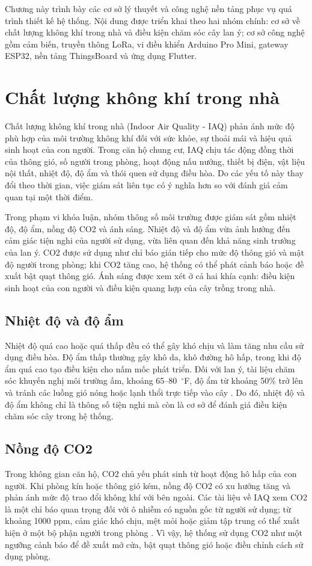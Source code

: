 Chương này trình bày các cơ sở lý thuyết và công nghệ nền tảng phục vụ quá trình thiết kế hệ thống. Nội dung được triển khai theo hai nhóm chính: cơ sở về chất lượng không khí trong nhà và điều kiện chăm sóc cây lan ý; cơ sở công nghệ gồm cảm biến, truyền thông LoRa, vi điều khiển Arduino Pro Mini, gateway ESP32, nền tảng ThingsBoard và ứng dụng Flutter.

\section{Chất lượng không khí trong nhà}
Chất lượng không khí trong nhà (Indoor Air Quality - IAQ) phản ánh mức độ phù hợp của môi trường không khí đối với sức khỏe, sự thoải mái và hiệu quả sinh hoạt của con người. Trong căn hộ chung cư, IAQ chịu tác động đồng thời của thông gió, số người trong phòng, hoạt động nấu nướng, thiết bị điện, vật liệu nội thất, nhiệt độ, độ ẩm và thói quen sử dụng điều hòa. Do các yếu tố này thay đổi theo thời gian, việc giám sát liên tục có ý nghĩa hơn so với đánh giá cảm quan tại một thời điểm.

Trong phạm vi khóa luận, nhóm thông số môi trường được giám sát gồm nhiệt độ, độ ẩm, nồng độ CO2 và ánh sáng. Nhiệt độ và độ ẩm vừa ảnh hưởng đến cảm giác tiện nghi của người sử dụng, vừa liên quan đến khả năng sinh trưởng của lan ý. CO2 được sử dụng như chỉ báo gián tiếp cho mức độ thông gió và mật độ người trong phòng; khi CO2 tăng cao, hệ thống có thể phát cảnh báo hoặc đề xuất bật quạt thông gió. Ánh sáng được xem xét ở cả hai khía cạnh: điều kiện sinh hoạt của con người và điều kiện quang hợp của cây trồng trong nhà.

\subsection{Nhiệt độ và độ ẩm}
Nhiệt độ quá cao hoặc quá thấp đều có thể gây khó chịu và làm tăng nhu cầu sử dụng điều hòa. Độ ẩm thấp thường gây khô da, khô đường hô hấp, trong khi độ ẩm quá cao tạo điều kiện cho nấm mốc phát triển. Đối với lan ý, tài liệu chăm sóc khuyến nghị môi trường ấm, khoảng 65--80~$^\circ$F, độ ẩm từ khoảng 50\% trở lên và tránh các luồng gió nóng hoặc lạnh thổi trực tiếp vào cây \cite{peace_lily_care_bhg}. Do đó, nhiệt độ và độ ẩm không chỉ là thông số tiện nghi mà còn là cơ sở để đánh giá điều kiện chăm sóc cây trong hệ thống.

\subsection{Nồng độ CO2}
Trong không gian căn hộ, CO2 chủ yếu phát sinh từ hoạt động hô hấp của con người. Khi phòng kín hoặc thông gió kém, nồng độ CO2 có xu hướng tăng và phản ánh mức độ trao đổi không khí với bên ngoài. Các tài liệu về IAQ xem CO2 là một chỉ báo quan trọng đối với ô nhiễm có nguồn gốc từ người sử dụng; từ khoảng 1000 ppm, cảm giác khó chịu, mệt mỏi hoặc giảm tập trung có thể xuất hiện ở một bộ phận người trong phòng \cite{co2_monitoring_rehva}. Vì vậy, hệ thống sử dụng CO2 như một ngưỡng cảnh báo để đề xuất mở cửa, bật quạt thông gió hoặc điều chỉnh cách sử dụng phòng.

